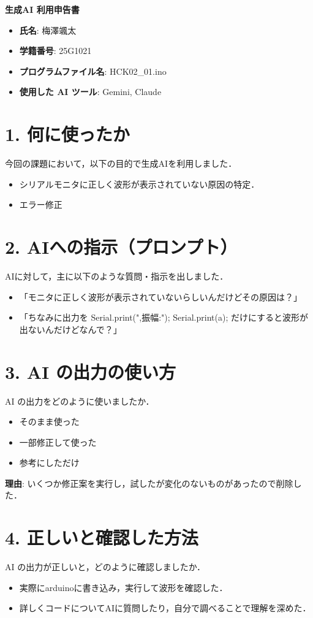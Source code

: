 \documentclass[a4paper,11pt]{jsarticle}
\begin{document}
{\Large \textbf{生成AI 利用申告書}}

\vspace{1em}

\begin{itemize}
    \item \textbf{氏名}: 梅澤颯太
    \item \textbf{学籍番号}: 25G1021
    \item \textbf{プログラムファイル名}: HCK02\_01.ino
    \item \textbf{使用した AI ツール}: Gemini, Claude
\end{itemize}

\section*{1. 何に使ったか}
今回の課題において，以下の目的で生成AIを利用しました．
\begin{itemize}
    \item シリアルモニタに正しく波形が表示されていない原因の特定．
    \item エラー修正
\end{itemize}

\section*{2. AIへの指示（プロンプト）}
AIに対して，主に以下のような質問・指示を出しました．
\begin{itemize}
    \item 「モニタに正しく波形が表示されていないらしいんだけどその原因は？」
    \item 「ちなみに出力を Serial.print(",振幅:"); Serial.print(a); だけにすると波形が出ないんだけどなんで？」
\end{itemize}

\section*{3. AI の出力の使い方}
AI の出力をどのように使いましたか．
\begin{itemize}
    \item[$\square$] そのまま使った
    \item[$\boxtimes$] 一部修正して使った
    \item[$\square$] 参考にしただけ
\end{itemize}
\textbf{理由}:
いくつか修正案を実行し，試したが変化のないものがあったので削除した．

\section*{4. 正しいと確認した方法}
AI の出力が正しいと，どのように確認しましたか．
\begin{itemize}
    \item 実際にarduinoに書き込み，実行して波形を確認した．
    \item 詳しくコードについてAIに質問したり，自分で調べることで理解を深めた．
\end{itemize}
\end{document}

